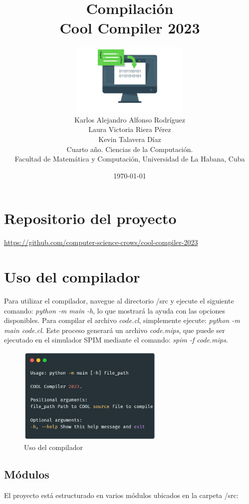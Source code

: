 \documentclass[10pt]{article} %
\title{\normalsize{Compilaci\'on}\\
	\Huge\bfseries Cool Compiler 2023 \\
} %
\author{%
	\includegraphics[width=15em]{logo.png}\\
	Karlos Alejandro Alfonso Rodríguez\\
	Laura Victoria Riera P\'erez\\
	Kevin Talavera Díaz \vspace{1em} \\
	\small Cuarto a\~no. Ciencias de la Computaci\'on. \\ %
	\small Facultad de Matem\'atica y Computaci\'on, Universidad de La Habana, Cuba \\ %
}
\date{\footnotesize \today } %
\begin{document}
	
	
	
	\maketitle
	
	
	\section*{Repositorio del proyecto}
	\begin{center}
		\url{https://github.com/computer-science-crows/cool-compiler-2023}
	\end{center}

	\section{Uso del compilador}
	
	Para utilizar el compilador, navegue al directorio /src y ejecute el siguiente comando: \textit{python -m main -h}, lo que mostrará la ayuda con las opciones disponibles. Para compilar el archivo \textit{code.cl}, simplemente ejecute: \textit{python -m main code.cl}. Este proceso generará un archivo \textit{code.mips}, que puede ser ejecutado en el simulador SPIM mediante el comando: \textit{spim -f code.mips}.
	
	\begin{figure}[H]
		\centering
		\includegraphics[width=7cm]{usage}
		\caption{Uso del compilador}
	\end{figure}

	\subsection{M\'odulos}
	
	El proyecto está estructurado en varios módulos ubicados en la carpeta /src:
	
\end{document}
